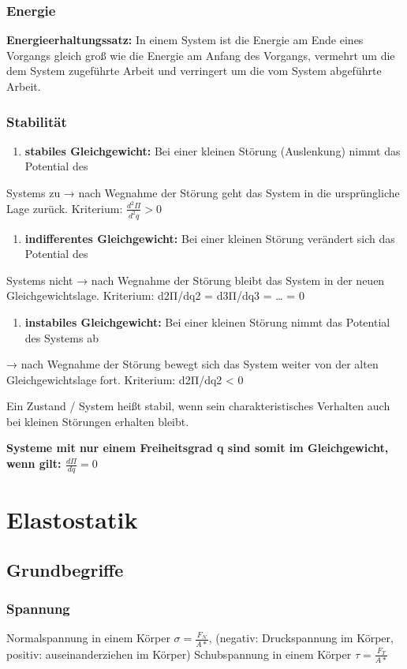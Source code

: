 \documentclass[11pt]{article}
\begin{document}
\subsubsection{Energie}
\label{sec:org6993f5e}
\textbf{Energieerhaltungssatz:}
In einem System ist die Energie am Ende eines Vorgangs gleich groß wie die Energie am Anfang
des Vorgangs, vermehrt um die dem System zugeführte Arbeit und verringert um die vom System
abgeführte Arbeit.
\subsubsection{Stabilität}
\label{sec:org85203cc}
\begin{enumerate}
\item \textbf{stabiles Gleichgewicht:} Bei einer kleinen Störung (Auslenkung) nimmt das Potential des
\end{enumerate}
Systems zu → nach Wegnahme der Störung geht das System in die ursprüngliche Lage
zurück. Kriterium: \(\frac{d^2\Pi}{d^2q} > 0\)
\begin{enumerate}
\item \textbf{indifferentes Gleichgewicht:} Bei einer kleinen Störung verändert sich das Potential des
\end{enumerate}
Systems nicht → nach Wegnahme der Störung bleibt das System in der neuen
Gleichgewichtslage. Kriterium: d2Π/dq2 = d3Π/dq3 = \ldots{} = 0
\begin{enumerate}
\item \textbf{instabiles Gleichgewicht:} Bei einer kleinen Störung nimmt das Potential des Systems ab
\end{enumerate}
→ nach Wegnahme der Störung bewegt sich das System weiter von der alten
Gleichgewichtslage fort. Kriterium: d2Π/dq2 < 0

Ein Zustand / System heißt stabil, wenn sein charakteristisches Verhalten auch bei kleinen
Störungen erhalten bleibt.

\textbf{Systeme mit nur einem Freiheitsgrad q sind somit im Gleichgewicht, wenn gilt: \(\frac{d\Pi}{dq} = 0\)}
\section{Elastostatik}
\label{sec:org08dc46f}
\subsection{Grundbegriffe}
\label{sec:orgc7bf06d}
\subsubsection{Spannung}
\label{sec:orgd6c9f8c}
Normalspannung in einem Körper \(\sigma = \frac{F_N}{A*}\), (negativ: Druckspannung im Körper, positiv: auseinanderziehen im Körper)
Schubspannung in einem Körper \(\tau = \frac{F_T}{A*}\)
\end{document}
